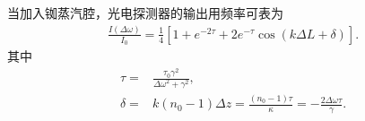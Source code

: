 \documentclass{assignment}
\begin{document}
\begin{sol}
    当加入铷蒸汽腔，光电探测器的输出用频率可表为
    \begin{align}
        \frac{I(\Delta\omega)}{I_0}=\frac{1}{4}\left[1+e^{-2\tau}+2e^{-\tau}\cos\left(k\Delta L+\delta\right)\right].
    \end{align}
    其中
    \begin{align}
        \tau=&\frac{\tau_0\gamma^2}{\Delta\omega^2+\gamma^2},\\
        \delta=&k(n_0-1)\Delta z=\frac{(n_0-1)\tau}{\kappa}=-\frac{2\Delta\omega\tau}{\gamma}.
    \end{align}
    \begin{figure}[h]
        \centering
        \caption{}
    \end{figure}
\end{sol}
\end{document}
